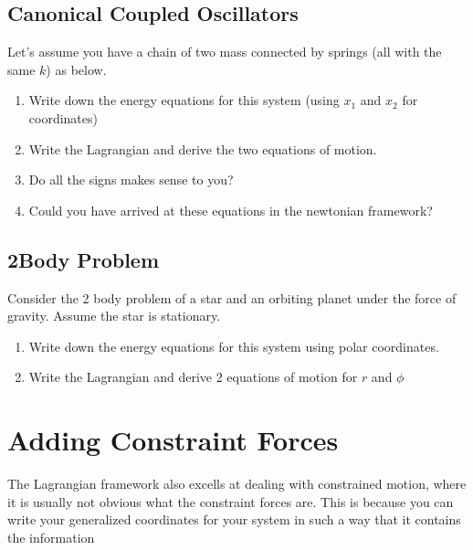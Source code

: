 \documentclass[letterpaper,10pt,english]{jupyterBook}
\begin{document}
\subsection{Canonical Coupled Oscillators}
\label{\detokenize{content/1_mechanics/lagrange_1:canonical-coupled-oscillators}}
\sphinxAtStartPar
Let’s assume you have a chain of two mass connected by springs (all with the same \(k\)) as below.



\sphinxAtStartPar
{}
\begin{enumerate}
%
\item {} 
\sphinxAtStartPar
Write down the energy equations for this system (using \(x_1\) and \(x_2\) for coordinates)

\item {} 
\sphinxAtStartPar
Write the Lagrangian and derive the two equations of motion.

\item {} 
\sphinxAtStartPar
Do all the signs makes sense to you?

\item {} 
\sphinxAtStartPar
Could you have arrived at these equations in the newtonian framework?

\end{enumerate}


\subsection{2\sphinxhyphen{}Body Problem}
\label{\detokenize{content/1_mechanics/lagrange_1:body-problem}}
\sphinxAtStartPar
Consider the 2 body problem of a star and an orbiting planet under the force of gravity. Assume the star is stationary.

\sphinxAtStartPar
{}
\begin{enumerate}
%
\item {} 
\sphinxAtStartPar
Write down the energy equations for this system using polar coordinates.

\item {} 
\sphinxAtStartPar
Write the Lagrangian and derive 2 equations of motion for \(r\) and \(\phi\)

\end{enumerate}


\section{Adding Constraint Forces}
\label{\detokenize{content/1_mechanics/lagrange_1:adding-constraint-forces}}
\sphinxAtStartPar
The Lagrangian framework also excells at dealing with constrained motion, where it is usually not obvious what the constraint forces are. This is because you can write your generalized coordinates for your system in such a way that it contains the information
\end{document}
